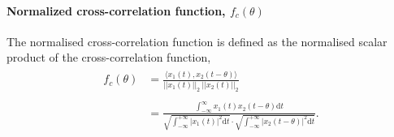 \paragraph{Normalized cross-correlation function, $f_c(\theta)$} The normalised cross-correlation function is defined as the normalised scalar product of the cross-correlation function, 
\begin{align*}
\begin{split}
    f_{c}(\theta)
    &= \frac{\langle x_{1}(t), x_{2}(t-\theta) \rangle}{ \lvert \lvert x_{1}(t) \rvert \rvert_{2} \ \lvert \lvert x_{2}(t) \rvert \rvert_{2}} \\\\
    &= \frac{\int_{-\infty}^{\infty}  x_{1}(t) x_{2}(t-\theta) \mathrm{d}t}{\sqrt{\int_{-\infty}^{+\infty}\lvert x_{1}(t)
    \rvert^{2} \mathrm{d}t} \cdot \sqrt{\int_{-\infty}^{+\infty}\lvert x_{2}(t-\theta) \rvert^{2} \mathrm{d}t}}.
\end{split}
\end{align*}

